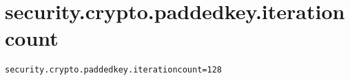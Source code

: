 \section{security.crypto.paddedkey.iterationcount}
\label{configuration:SecurityCryptoPaddedkeyIterationcount}
\AvailableInJavaOnly{\TODO}
\begin{lstlisting}[style=Props,caption={Usage example for \textit{security.crypto.paddedkey.iterationcount}}]
security.crypto.paddedkey.iterationcount=128
\end{lstlisting}